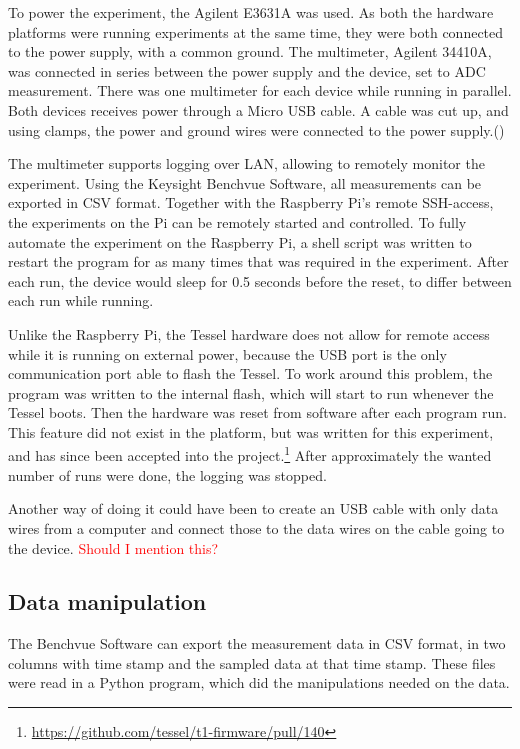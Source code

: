 To power the experiment, the Agilent E3631A was used. 
As both the hardware platforms were running experiments at the same time, they were both connected to the power supply, with a common ground. 
The multimeter, Agilent 34410A, was connected in series between the power supply and the device, set to ADC measurement. 
There was one multimeter for each device while running in parallel.
Both devices receives power through a Micro USB cable.
A cable was cut up, and using clamps, the power and ground wires were connected to the power supply.(\cite{usbmicro})

The multimeter supports logging over LAN, allowing to remotely monitor the experiment.
Using the Keysight Benchvue Software, all measurements can be exported in CSV format.
Together with the Raspberry Pi's remote SSH-access, the experiments on the Pi can be remotely started and controlled.
To fully automate the experiment on the Raspberry Pi, a shell script was written to restart the program for as many times that was required in the experiment.
After each run, the device would sleep for 0.5 seconds before the reset, to differ between each run while running.

Unlike the Raspberry Pi, the Tessel hardware does not allow for remote access while it is running on external power, because the USB port is the only communication port able to flash the Tessel.
To work around this problem, the program was written to the internal flash, which will start to run whenever the Tessel boots.
Then the hardware was reset from software after each program run.
This feature did not exist in the platform, but was written for this experiment, and has since been accepted into the project.\footnote{\url{https://github.com/tessel/t1-firmware/pull/140}}
After approximately the wanted number of runs were done, the logging was stopped.

Another way of doing it could have been to create an USB cable with only data wires from a computer and connect those to the data wires on the cable going to the device. \textcolor{red}{Should I mention this?}


\subsection{Data manipulation}
The Benchvue Software can export the measurement data in CSV format, in two columns with time stamp and the sampled data at that time stamp.
These files were read in a Python program, which did the manipulations needed on the data.

